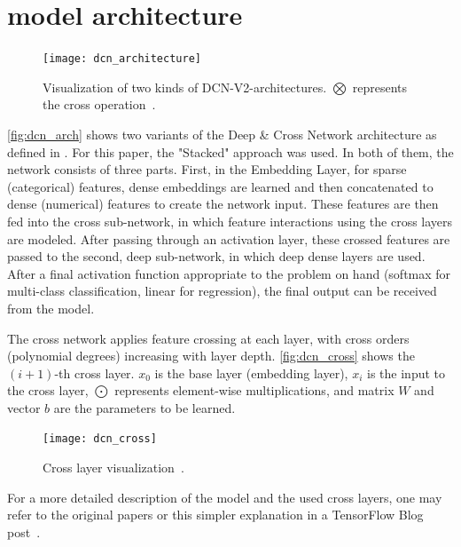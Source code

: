 \documentclass[10pt,final,journal,a4paper,oneside,twocolumn]{IEEEtran}
\begin{document}
\section{model architecture}\label{sec:model_arch}

\begin{figure}[ht]
    \centering
    \texttt{[image: dcn\_architecture]}
    \caption{Visualization of two kinds of DCN-V2-architectures. $ \bigotimes $ represents the cross operation~\cite{Wang.2021}.}
    \label{fig:dcn_arch}
\end{figure}

\autoref{fig:dcn_arch} shows two variants of the Deep \& Cross Network architecture as defined in \cite{Wang.2021}. For this paper, the "Stacked" approach was used.
In both of them, the network consists of three parts. First, in the Embedding Layer, for sparse (categorical) features, dense embeddings are learned and then concatenated to dense (numerical) features to create the network input. These features are then fed into the cross sub-network, in which feature interactions using the cross layers are modeled. After passing through an activation layer, these crossed features are passed to the second, deep sub-network, in which deep dense layers are used. After a final activation function appropriate to the problem on hand (softmax for multi-class classification, linear for regression), the final output can be received from the model.

The cross network applies feature crossing at each layer, with cross orders (polynomial degrees) increasing with layer depth. \autoref{fig:dcn_cross} shows the $ (i+1) $-th cross layer.
$ x_{0} $ is the base layer (embedding layer), $ x_{i} $  is the input to the cross layer, $ \bigodot $ represents element-wise multiplications, and matrix $ W $ and vector $ b $ are the parameters to be learned.

\begin{figure}[ht]
    \centering
    \texttt{[image: dcn\_cross]}
    \caption{Cross layer visualization~\cite{Wang.2021}.}
    \label{fig:dcn_cross}
\end{figure}

For a more detailed description of the model and the used cross layers, one may refer to the original papers or this simpler explanation in a TensorFlow Blog post~\cite{Wang.2020}.


\end{document}
